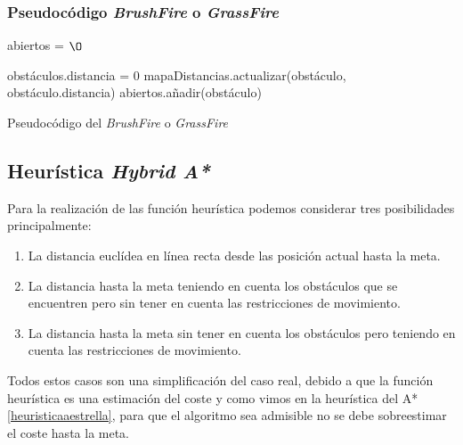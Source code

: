 \clearpage
\subsubsection{Pseudocódigo \textit{BrushFire} o \textit{GrassFire}} \label{brushfire}
\begin{algorithm}[H]
	abiertos = $\O$\;

    
     {
    		obstáculos.distancia = 0\;
    		mapaDistancias.actualizar(obstáculo, obstáculo.distancia)\;
    		abiertos.añadir(obstáculo)\;
    	}


 \caption{Pseudocódigo del \textit{BrushFire} o \textit{GrassFire}}
\end{algorithm}

\subsection{Heurística \textit{Hybrid A*}} \label{hueristicahybrid}
Para la realización de las función heurística podemos considerar tres posibilidades principalmente:

\begin{enumerate}
\item La distancia euclídea en línea recta desde las posición actual hasta la meta.
\item La distancia hasta la meta teniendo en cuenta los obstáculos que se encuentren pero sin tener en cuenta las restricciones de movimiento.
\item La distancia hasta la meta sin tener en cuenta los obstáculos pero teniendo en cuenta las restricciones de movimiento.
\end{enumerate}

Todos estos casos son una simplificación del caso real, debido a que la función heurística es una estimación del coste y como vimos en la heurística del A* \ref{heuristicaaestrella}, para que el algoritmo sea admisible no se debe sobreestimar el coste hasta la meta.


